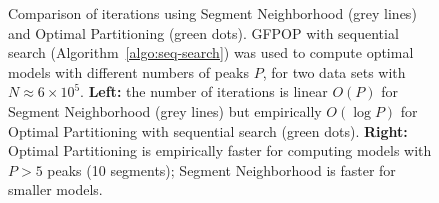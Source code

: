 \documentclass[article]{jss}
\begin{document}
\begin{figure}[t!]
\centering
\begin{minipage}{3in}
  
\end{minipage}
\begin{minipage}{3in} 
  
\end{minipage}
\vskip -0.5cm
\caption{\label{fig:variable-peaks} Comparison of iterations using
  Segment Neighborhood (grey lines) and Optimal Partitioning (green
  dots). GFPOP with sequential search
  (Algorithm~\ref{algo:seq-search}) was used to compute optimal models
  with different numbers of peaks $P$, for two data sets with
  $N\approx 6\times 10^5$. \textbf{Left:} the number of iterations is
  linear $O(P)$ for Segment Neighborhood (grey lines) but empirically
  $O(\log P)$ for Optimal Partitioning with sequential search (green
  dots). \textbf{Right:} Optimal Partitioning is empirically faster
  for computing models with $P>5$ peaks (10 segments); Segment
  Neighborhood is faster for smaller models.}
\end{figure}



 

\end{document}
